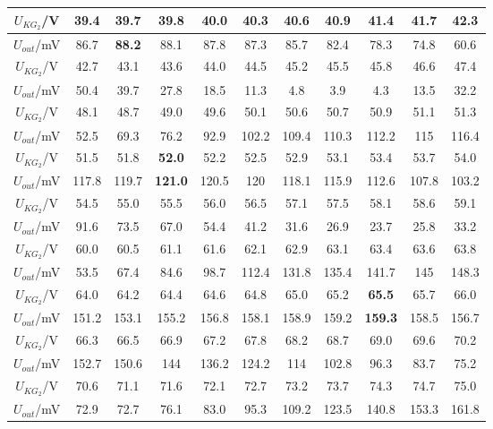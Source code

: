 \documentclass[a4paper,10pt,notitlepage]{article}
\begin{document}
\begin{center}
\begin{longtable}{|c|c|c|c|c|c|c|c|c|c|c|}
	\hline
	\hline
	$U_{KG_2}$/V & 39.4 & \textbf{39.7} & 39.8 & 40.0 & 40.3 & 40.6 & 40.9 & 41.4 & 41.7 & 42.3 \\
	\hline
	$U_{out}$/mV & 86.7 & \textbf{88.2} & 88.1 & 87.8 & 87.3 & 85.7 & 82.4 & 78.3 & 74.8 & 60.6 \\
	\hline
	\hline
	$U_{KG_2}$/V & 42.7 & 43.1 & 43.6 & 44.0 & 44.5 & 45.2 & 45.5 & 45.8 & 46.6 & 47.4 \\
	\hline
	$U_{out}$/mV & 50.4 & 39.7 & 27.8 & 18.5 & 11.3 & 4.8 & 3.9 & 4.3 & 13.5 & 32.2 \\
	\hline
	\hline
	$U_{KG_2}$/V & 48.1 & 48.7 & 49.0 & 49.6 & 50.1 & 50.6 & 50.7 & 50.9 & 51.1 & 51.3 \\
	\hline
	$U_{out}$/mV & 52.5 & 69.3 & 76.2 & 92.9 & 102.2 & 109.4 & 110.3 & 112.2 & 115 & 116.4 \\
	\hline
	\hline
	$U_{KG_2}$/V & 51.5 & 51.8 & \textbf{52.0} & 52.2 & 52.5 & 52.9 & 53.1 & 53.4 & 53.7 & 54.0 \\
	\hline
	$U_{out}$/mV & 117.8 & 119.7 & \textbf{121.0} & 120.5 & 120 & 118.1 & 115.9 & 112.6 & 107.8 & 103.2 \\
	\hline
	\hline
	$U_{KG_2}$/V & 54.5 & 55.0 & 55.5 & 56.0 & 56.5 & 57.1 & 57.5 & 58.1 & 58.6 & 59.1 \\
	\hline
	$U_{out}$/mV & 91.6 & 73.5 & 67.0 & 54.4 & 41.2 & 31.6 & 26.9 & 23.7 & 25.8 & 33.2 \\
	\hline
	\hline
	$U_{KG_2}$/V & 60.0 & 60.5 & 61.1 & 61.6 & 62.1 & 62.9 & 63.1 & 63.4 & 63.6 & 63.8 \\
	\hline
	$U_{out}$/mV & 53.5 & 67.4 & 84.6 & 98.7 & 112.4 & 131.8 & 135.4 & 141.7 & 145 & 148.3 \\
	\hline
	\hline
	$U_{KG_2}$/V & 64.0 & 64.2 & 64.4 & 64.6 & 64.8 & 65.0 & 65.2 & \textbf{65.5} & 65.7 & 66.0 \\
	\hline
	$U_{out}$/mV & 151.2 & 153.1 & 155.2 & 156.8 & 158.1 & 158.9 & 159.2 & \textbf{159.3} & 158.5 & 156.7 \\
	\hline
	\hline
	$U_{KG_2}$/V & 66.3 & 66.5 & 66.9 & 67.2 & 67.8 & 68.2 & 68.7 & 69.0 & 69.6 & 70.2 \\
	\hline
	$U_{out}$/mV & 152.7 & 150.6 & 144 & 136.2 & 124.2 & 114 & 102.8 & 96.3 & 83.7 & 75.2 \\
	\hline
	\hline
	$U_{KG_2}$/V & 70.6 & 71.1 & 71.6 & 72.1 & 72.7 & 73.2 & 73.7 & 74.3 & 74.7 & 75.0 \\
	\hline
	$U_{out}$/mV & 72.9 & 72.7 & 76.1 & 83.0 & 95.3 & 109.2 & 123.5 & 140.8 & 153.3 & 161.8 \\
	\hline
	\hline

\end{longtable}
\end{center}
\end{document}
